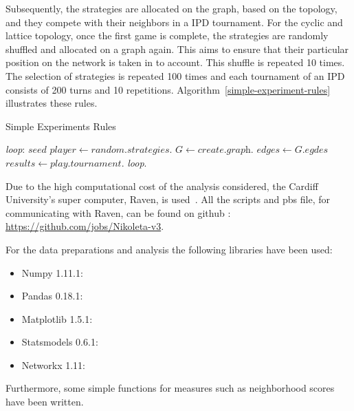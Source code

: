 Subsequently, the strategies are allocated on the graph, based
on the topology, and they compete with their neighbors in a IPD tournament.
For the cyclic and lattice topology, once the first game is complete,
the strategies are randomly shuffled and allocated on a graph again. This aims
to ensure that their particular position on the network is taken in to account.
This shuffle is repeated 10 times. The selection of strategies is repeated 100 times
and each tournament of an IPD consists of 200 turns and 10 repetitions.
Algorithm~\ref{simple-experiment-rules} illustrates these rules.

\begin{algorithm}
  \caption{Simple Experiments Rules}\label{simple-experiment-rules}
  \begin{algorithmic}
  \BState \emph{loop}:
  \State $seed$ 
  \State $player \gets \textit{random.strategies}$.
  \State $G \gets \textit{create.graph}$.
  \State $edges \gets \textit{G.egdes}$
  \State $results \gets \textit{play.tournament}$.
  \emph{loop}.
  \EndFor
  \EndFor
  \EndProcedure
  \end{algorithmic}
\end{algorithm}

Due to the high computational cost of the analysis considered, the Cardiff
University's super computer, Raven, is used~\cite{raven}. All the scripts and pbs file, for
communicating with Raven, can be found on github :
\url{https://github.com/jobs/Nikoleta-v3}.

For the data preparations and analysis the following libraries have been used:
\begin{multicols}{2}
  \begin{itemize}
    \item Numpy 1.11.1:
    \item Pandas 0.18.1:
    \item Matplotlib 1.5.1:
    \item Statsmodels 0.6.1:
    \item Networkx 1.11:
  \end{itemize}
\end{multicols}

Furthermore, some simple functions for measures such as neighborhood scores
have been written.

